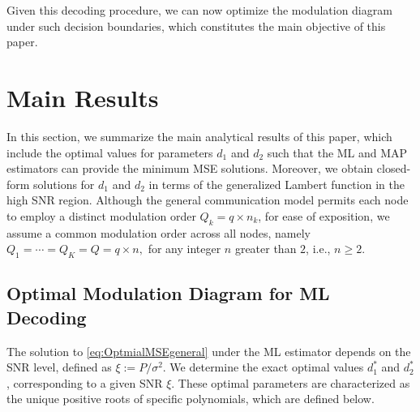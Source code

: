 \documentclass[journal,12pt,onecolumn,draftclsnofoot]{IEEEtran}
\theoremstyle{definition}
\begin{document}
Given this decoding procedure, we can now optimize the modulation diagram under such decision boundaries, which constitutes the main objective of this paper. 




\section{Main Results}\label{sec:MainResults}



In this section, we summarize the main analytical results of this paper, which include the optimal values for parameters $d_1$ and $d_2$ such that the ML and MAP estimators can provide the minimum MSE solutions. Moreover, we obtain closed-form solutions for  $d_1$ and $d_2$  in terms of the generalized Lambert function in the high SNR region. Although the general communication model permits each node to employ a distinct modulation order $Q_{k} = q \times n_{k}$, for ease of exposition,  we assume a common modulation order across all nodes, namely $Q_{1} = \cdots = Q_{K} = Q = q \times n,$ for any integer $n$ greater than $2$, i.e.,  $ n \ge 2$. 


\subsection{Optimal Modulation Diagram for ML Decoding}

The solution to \eqref{eq:OptmialMSEgeneral} under the ML estimator depends on the SNR level,  defined as $\xi:=P/\sigma^2$. We determine the exact optimal values $d_1^*$ and $d_2^*$,  corresponding to a given SNR $\xi$. These optimal parameters are characterized as the unique positive roots of specific polynomials, which are defined below.
\end{document}

